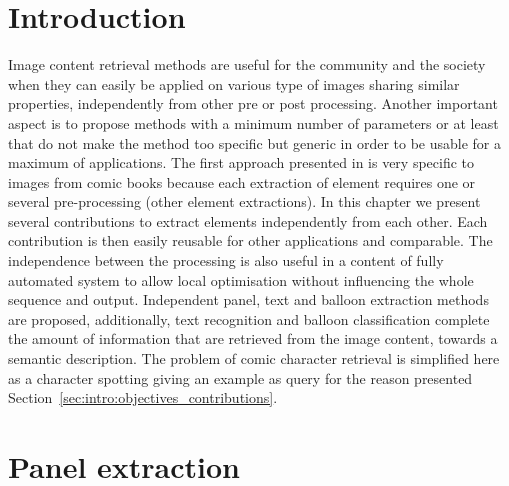 \section{Introduction}
\label{sec:in:intro}

Image content retrieval methods are useful for the community and the society when they can easily be applied on various type of images sharing similar properties, independently from other pre or post processing.
Another important aspect is to propose methods with a minimum number of parameters or at least that do not make the method too specific but generic in order to be usable for a maximum of applications.
The first approach presented in  is very specific to images from comic books because each extraction of element requires one or several pre-processing (other element extractions).
In this chapter we present several contributions to extract elements independently from each other.
Each contribution is then easily reusable for other applications and comparable.
The independence between the processing is also useful in a content of fully automated system to allow local optimisation without influencing the whole sequence and output.
Independent panel, text and balloon extraction methods are proposed, additionally, text recognition and balloon classification complete the amount of information that are retrieved from the image content, towards a semantic description.
The problem of comic character retrieval is simplified here as a character spotting giving an example as query for the reason presented Section~\ref{sec:intro:objectives_contributions}.

\section{Panel extraction}
\label{sec:in:panel_extraction}


